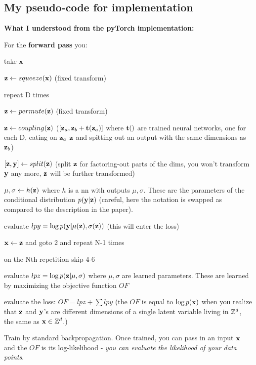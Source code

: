 \subsection{My pseudo-code for implementation}
\begin{notebox}
\textbf{What I understood from the pyTorch implementation:}

For the \textbf{forward pass} you:
\begin{compactenum}
\item take $\mathbf{x}$
\item $\mathbf{z} \gets squeeze(\mathbf{x})$ (fixed transform)
\item repeat D times
\begin{compactitem}
\item $\mathbf{z} \gets permute(\mathbf{z})$ (fixed transform)
\item $\mathbf{z} \gets coupling(\mathbf{z})$ ($[\mathbf{z}_a, \mathbf{z}_b + \mathbf{t}(\mathbf{z}_a)]$ where $\mathbf{t}()$ are trained neural networks, one for each D, eating on $\mathbf{z}_a$ $\mathbf{z}$ and spitting out an output with the same dimensions as $\mathbf{z}_b$)
\end{compactitem}
\item $[\mathbf{z}, \mathbf{y}] \gets split(\mathbf{z})$ (split $\mathbf{z}$ for factoring-out parts of the dims, you won't transform $\mathbf{y}$ any more, $\mathbf{z}$ will be further transformed)
\item $\mu, \sigma \gets h(\mathbf{z})$ where $h$ is a nn with outputs $\mu, \sigma$. These are the parameters of the conditional distribution $p(\mathbf{y} \vert \mathbf{z})$ (careful, here the notation is swapped as compared to the description in the paper).
\item evaluate $lpy = \log p(\mathbf{y} | \mu(\mathbf{z}), \sigma(\mathbf{z}))$ (this will enter the loss)
\item $\mathbf{x} \gets \mathbf{z}$ and goto 2 and repeat N-1 times
\item on the Nth repetition skip 4-6
\item evaluate $lpz = \log p(\mathbf{z} | \mu, \sigma)$ where $\mu, \sigma$ are learned parameters. These are learned by maximizing the objective function $OF$
\item evaluate the loss: $OF = lpz + \sum lpy$ (the $OF$ is equal to $\log p(\mathbf{x})$ when you realize that $\mathbf{z}$ and $\mathbf{y}$'s are different dimensions of a single latent variable living in $\mathbb{Z}^d$, the same as $\mathbf{x} \in \mathbb{Z}^d$.)
\end{compactenum}

Train by standard backpropagation. Once trained, you can pass in an input $\mathbf{x}$ and the $OF$ is its log-likelihood - \emph{you can evaluate the likelihood of your data points}. \\


\end{notebox}
